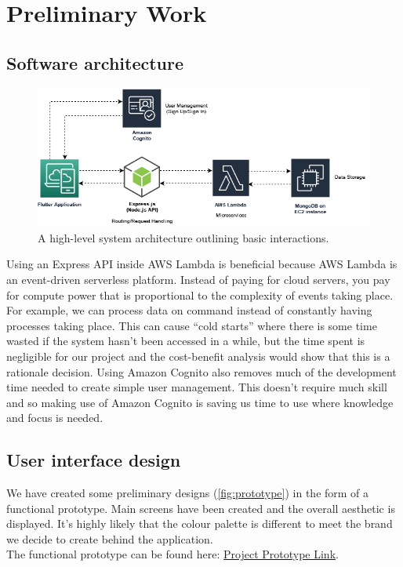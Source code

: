 \chapter{Preliminary Work}
\label{chap:preliminary-work}
\vspace{-10mm}
\section{Software architecture}
\label{sec:architecture}
\begin{figure}[H]
    \centering
    \includegraphics[width=\textwidth]{graphics/project-architecture.png}
    \caption{A high-level system architecture outlining basic interactions.}
    \label{fig:architecture-diagram}
\end{figure}
\vspace{-5mm}
Using an Express API inside AWS Lambda is beneficial because
AWS Lambda is an event-driven serverless platform. Instead of paying for cloud servers, you pay for compute power
that is proportional to the complexity of events taking place. For example,
we can process data on command instead of constantly having processes taking place.
This can cause ``cold starts'' where there is some time wasted if the system hasn't been accessed
in a while, but the time spent is negligible for our project and the cost-benefit analysis would show
that this is a rationale decision. Using Amazon Cognito also removes much of the development
time needed to create simple user management. This doesn't require much skill and so making use of 
Amazon Cognito is saving us time to use where knowledge and focus is needed.
\pagebreak

\section{User interface design}
\label{sec:UI-design}
\vspace{-3mm}
We have created some preliminary designs (\cref{fig:prototype}) in the form of a functional prototype.
Main screens have been created and the overall aesthetic is displayed.
It's highly likely that the colour palette is different to meet the brand
we decide to create behind the application.\\
The functional prototype can be found here: \href{https://www.figma.com/proto/aANVZK2JZcBTPZCzaFYvbm/Final-Year-Project-Prototype?scaling=scale-down&page-id=0%3A1&starting-point-node-id=0%3A3&node-id=0%3A3}{Project Prototype Link}.
\vspace{-2mm}

